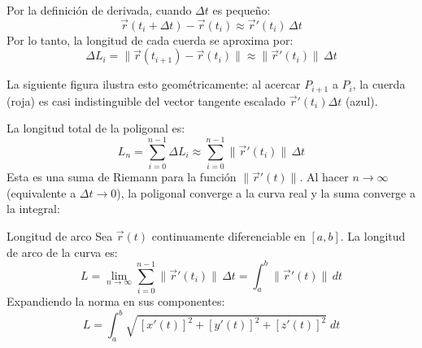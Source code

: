 Por la definición de derivada, cuando $\Delta t$ es pequeño:
\[ \vec{r}(t_i + \Delta t) - \vec{r}(t_i) \approx \vec{r}'(t_i)\,\Delta t \]
Por lo tanto, la longitud de cada cuerda se aproxima por:
\[ \Delta L_i = \|\vec{r}(t_{i+1}) - \vec{r}(t_i)\| \approx \|\vec{r}'(t_i)\|\,\Delta t \]

La siguiente figura ilustra esto geométricamente: al acercar $P_{i+1}$ a $P_i$, la cuerda (roja) es casi indistinguible del vector tangente escalado $\vec{r}'(t_i)\Delta t$ (azul).

\begin{center}
\shorthandoff{>}
\end{center}

La longitud total de la poligonal es:
\[ L_n = \sum_{i=0}^{n-1} \Delta L_i \approx \sum_{i=0}^{n-1} \|\vec{r}'(t_i)\|\,\Delta t \]
Esta es una suma de Riemann para la función $\|\vec{r}'(t)\|$. Al hacer $n \to \infty$ (equivalente a $\Delta t \to 0$), la poligonal converge a la curva real y la suma converge a la integral:

\begin{mydefinition}{Longitud de arco}
Sea $\vec{r}(t)$ continuamente diferenciable en $[a, b]$. La longitud de arco de la curva es:
\[ L = \lim_{n\to\infty} \sum_{i=0}^{n-1}\|\vec{r}'(t_i)\|\,\Delta t = \int_a^b \|\vec{r}'(t)\|\, dt \]
Expandiendo la norma en sus componentes:
\[ L = \int_a^b \sqrt{\,[x'(t)]^2 + [y'(t)]^2 + [z'(t)]^2}\; dt \]
\end{mydefinition}

